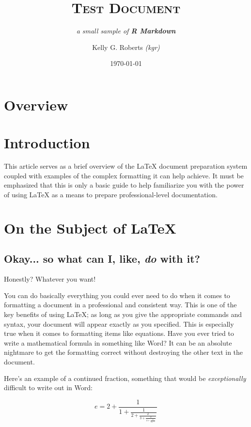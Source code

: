 \documentclass[
]{article}
\title{\huge \textsc{Test Document}}
\subtitle{\textit{a small sample of \textbf{R Markdown}}}
\author{Kelly G. Roberts \textit{(kgr)}}
\date{\today}
\begin{document}
\maketitle

\newpage
{}
\tableofcontents
\newpage

\hypertarget{overview}{%
\section{Overview}\label{overview}}

\section{Introduction}

This article serves as a brief overview of the \LaTeX{} document
preparation system coupled with examples of the complex formatting it
can help achieve. It must be emphasized that this is only a basic guide
to help familiarize you with the power of using \LaTeX{} as a means to
prepare professional-level documentation.

\section{On the Subject of \LaTeX}

\subsection{Okay... so what can I, like, \textit{do} with it?}

Honestly? Whatever you want!

You can do basically everything you could ever need to do when it comes
to formatting a document in a professional and consistent way. This is
one of the key benefits of using \LaTeX{}; as long as you give the
appropriate commands and syntax, your document will appear exactly as
you specified. This is especially true when it comes to formatting items
like equations. Have you ever tried to write a mathematical formula in
something like Word? It can be an absolute nightmare to get the
formatting correct without destroying the other text in the document.

Here's an example of a continued fraction, something that would be
\emph{exceptionally} difficult to write out in Word:

\[ e=2+\frac{1}{1+\frac{1}{2+\frac{2}{3+\frac{3}{4+\frac{4}{5+\ddots}}}}} \]
\end{document}
